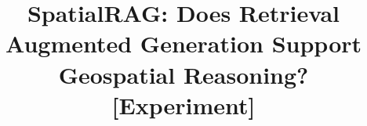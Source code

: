 \documentclass[sigconf,natbib=true]{style/acmart}
\theoremstyle{plain}
\theoremstyle{definition}
\theoremstyle{remark}
\begin{document}












\title{SpatialRAG: Does Retrieval Augmented Generation Support Geospatial Reasoning? [Experiment]}
\end{document}
